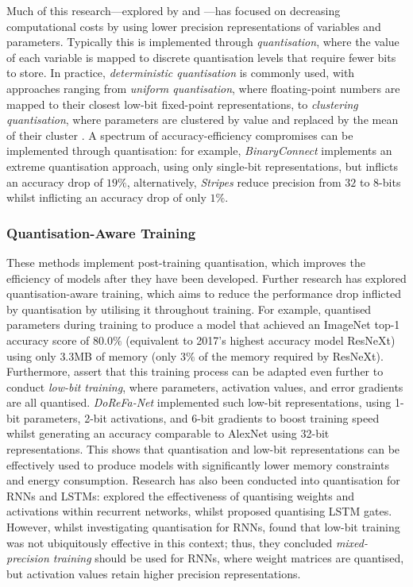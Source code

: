 \documentclass[a4paper, 11pt]{report}
\begin{document}
    Much of this research---explored by \citet{xu-2021} and \citet{cai-2022}---has focused on decreasing computational costs by using lower precision representations of variables and parameters. Typically this is implemented through \emph{quantisation}, where the value of each variable is mapped to discrete quantisation levels that require fewer bits to store. In practice, \emph{deterministic quantisation} is commonly used, with approaches ranging from \emph{uniform quantisation}, where floating-point numbers are mapped to their closest low-bit fixed-point representations, to \emph{clustering quantisation}, where parameters are clustered by value and replaced by the mean of their cluster \citep{xu-2021}. A spectrum of accuracy-efficiency compromises can be implemented through quantisation: for example, \emph{BinaryConnect} \citep{courbariaux-2015} implements an extreme quantisation approach, using only single-bit representations, but inflicts an accuracy drop of $19\%$, alternatively, \emph{Stripes} \citep{judd-2016} reduce precision from $32$ to $8$-bits whilst inflicting an accuracy drop of only $1\%$.

    \subsubsection{Quantisation-Aware Training}
    \label{section: quantisation-training}

    These methods implement post-training quantisation, which improves the efficiency of models after they have been developed. Further research has explored quantisation-aware training, which aims to reduce the performance drop inflicted by quantisation by utilising it throughout training. For example, \citet{fan-2020b} quantised parameters during training to produce a model that achieved an ImageNet top-1 accuracy score of $80.0\%$ (equivalent to 2017's highest accuracy model ResNeXt) using only $3.3$MB of memory (only $3\%$ of the memory required by ResNeXt). Furthermore, \citet{cai-2022} assert that this training process can be adapted even further to conduct \emph{low-bit training}, where parameters, activation values, and error gradients are all quantised. \emph{DoReFa-Net} \citep{zhou-2016} implemented such low-bit representations, using 1-bit parameters, 2-bit activations, and 6-bit gradients to boost training speed whilst generating an accuracy comparable to AlexNet using 32-bit representations. This shows that quantisation and low-bit representations can be effectively used to produce models with significantly lower memory constraints and energy consumption. Research has also been conducted into quantisation for RNNs and LSTMs: \citet{hubara-2016} explored the effectiveness of quantising weights and activations within recurrent networks, whilst \citet{he-2016} proposed quantising LSTM gates. However, whilst investigating quantisation for RNNs, \citet{ott-2017} found that low-bit training was not ubiquitously effective in this context; thus, they concluded \emph{mixed-precision training} should be used for RNNs, where weight matrices are quantised, but activation values retain higher precision representations.
\end{document}

